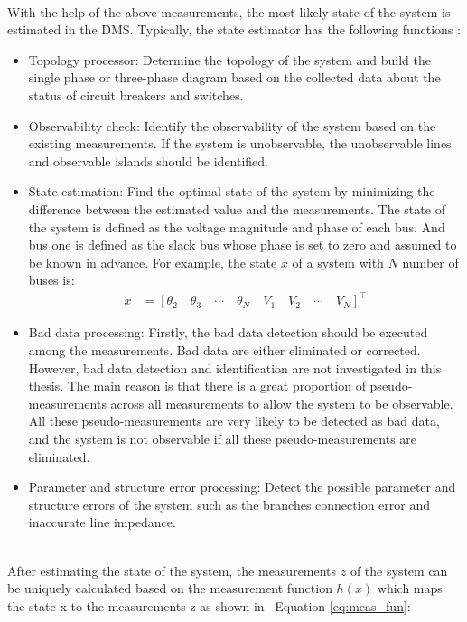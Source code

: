 \bigskip
\\With the help of the above measurements, the most likely state of the system is estimated in the DMS. Typically, the state estimator has the following functions
\cite{gomez2004power}: 
\begin{itemize}
    \item Topology processor: Determine the topology of the system and build the single phase or three-phase diagram based on the collected data about the status of circuit breakers and switches.
    \item Observability check: Identify the observability of the system based on the existing measurements. If the system is unobservable, the unobservable lines and observable islands should be identified.
    \item State estimation: Find the optimal state of the system by minimizing the difference between the estimated value and the measurements. The state of the system is defined as the voltage magnitude and phase of each bus. And bus one is defined as the slack bus whose phase is set to zero and assumed to be known in advance. For example, the state $x$ of a system with $N$ number of buses is:
        \begin{align} 
    	    x &=  [\theta_{2} \quad \theta_{3} \quad \cdots \quad \theta_{N} \quad V_{1} \quad V_{2} \quad \cdots \quad V_{N} ]^\intercal
    	    \label{eq:state} 
        \end{align}
   
    \item Bad data processing: Firstly, the bad data detection should be executed among the measurements. Bad data are either eliminated or corrected. However, bad data detection and identification are not investigated in this thesis. The main reason is that there is a great proportion of pseudo-measurements across all measurements to allow the system to be observable. All these pseudo-measurements are very likely to be detected as bad data, and the system is not observable if all these pseudo-measurements are eliminated.
    \item Parameter and structure error processing: Detect the possible parameter and structure errors of the system such as the branches connection error and inaccurate line impedance.
\end{itemize}
\bigskip
\\After estimating the state of the system, the measurements $z$ of the system can be uniquely calculated based on the measurement function $h(x)$ which maps the state x to the measurements z as shown in ~Equation \ref{eq:meas_fun}:

